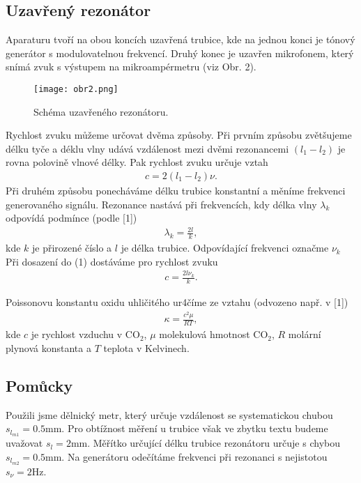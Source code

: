 \subsection{Uzavřený rezonátor}
\par Aparaturu tvoří na obou koncích uzavřená trubice, kde na jednou konci je tónový generátor s modulovatelnou frekvencí. Druhý konec je uzavřen mikrofonem, který snímá zvuk s výstupem na mikroampérmetru (viz Obr. 2).
\begin{figure}[h]
\centering
\texttt{[image: obr2.png]}
\caption{Schéma uzavřeného rezonátoru.}
\end{figure}
Rychlost zvuku můžeme určovat dvěma způsoby. Při prvním způsobu zvětšujeme délku tyče a déklu vlny udává vzdálenost mezi dvěmi rezonancemi $(l_1 - l_2)$ je rovna polovině vlnové délky. Pak rychlost zvuku určuje vztah
\begin{align}
    c = 2(l_1 - l_2)\nu.
\end{align}
Při druhém způsobu ponecháváme délku trubice konstantní a měníme frekvenci generovaného signálu. Rezonance nastává při frekvencích, kdy délka vlny $\lambda_k$ odpovídá podmínce (podle [1])
\begin{align}
    \lambda_k = \frac{2l}{k},
\end{align}
kde $k$ je přirozené číslo a $l$ je délka trubice. Odpovídající frekvenci označme $\nu_k$ Při dosazení do (1) dostáváme pro rychlost zvuku
\begin{align}
    c = \frac{2l \nu_k}{k}.
\end{align}
\par Poissonovu konstantu oxidu uhličitého ur4číme ze vztahu (odvozeno např. v [1])
\begin{align}
    \kappa  = \frac{c^2\mu}{RT},
\end{align}
kde $c$ je rychlost vzduchu v $\mathrm{CO_2}$, $\mu$ molekulová hmotnost $\mathrm{CO_2}$, $R$ molární plynová konstanta a $T$ teplota v Kelvinech.

\subsection{Pomůcky}
\par Použili jsme dělnický metr, který určuje vzdálenost se systematickou chubou $s_{l_{m1}} = 0.5$mm. Pro obtížnost měření u trubice však ve zbytku textu budeme uvažovat $s_l = 2$mm.
Měřítko určující délku trubice rezonátoru určuje s chybou $s_{l_{m2}} = 0.5$mm. Na generátoru odečítáme frekvenci při rezonanci s nejistotou $s_{\nu} = 2 \mathrm{Hz}$. 
